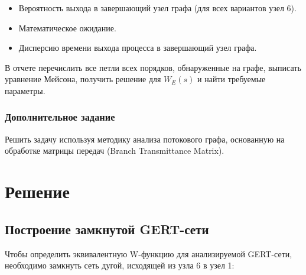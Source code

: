 \begin{itemize}
	\item Вероятность выхода в завершающий узел графа (для всех вариантов узел 6).
	\item Математическое ожидание.
	\item Дисперсию времени выхода процесса в завершающий узел графа.
\end{itemize}

В отчете перечислить все петли всех порядков, обнаруженные на графе, выписать уравнение Мейсона, получить решение для $W_E(s)$ и найти требуемые параметры.

\subsubsection{Дополнительное задание}

Решить задачу используя методику анализа потокового графа, основанную на обработке матрицы передач (Branch Transmittance Matrix).

\section{Решение}

\subsection{Построение замкнутой GERT-сети}

Чтобы определить эквивалентную W-функцию для анализируемой GERT-сети, необходимо замкнуть сеть дугой, исходящей из узла 6 в узел 1:

